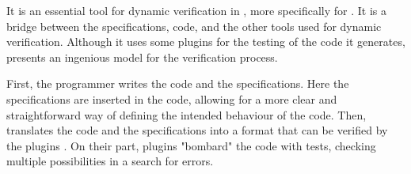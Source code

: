 It is an essential tool for dynamic verification in \ocaml, more specifically for 
\rac. It is a bridge between the \gospellang specifications, \ocaml code, and the other tools 
used for dynamic verification. Although it uses some plugins for the testing of the code it 
generates, \ortac presents an ingenious model for the verification process.

First, the programmer writes the \ocaml code and the \gospellang specifications. Here the 
specifications are inserted in the code, allowing for a more clear and straightforward 
way of defining the intended behaviour of the code. Then, \ortac translates the code 
and the specifications into a format that can be verified by the plugins . On their part, 
plugins "bombard" the code with tests, checking multiple possibilities in a search 
for errors.